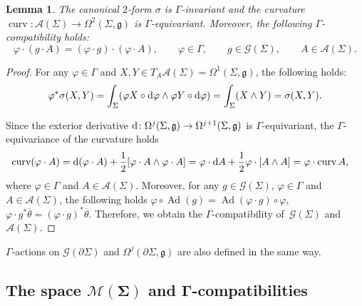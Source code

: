 \documentclass[pdftex]{sigma}
\numberwithin{equation}{section}
\newtheorem{Lemma}[Theorem]{Lemma}
\theoremstyle{definition}
\newcommand{\Ad}{\operatorname{Ad}}
\newcommand{\curv}{\operatorname{curv}}
\begin{document}
\begin{Lemma}\label{lemm of compati for conn}
 The canonical $2$-form $\sigma$ is $\Gamma$-invariant and the curvature $\curv \colon \mathcal{A}(\Sigma) \to \Omega^{2}(\Sigma,\mathfrak{g})$ is $\Gamma$-equivariant.
 Moreover, the following $\Gamma$-compatibility holds:
 \[
 \varphi \cdot (g \cdot A) = (\varphi \cdot g) \cdot (\varphi \cdot A), \qquad \varphi \in \Gamma,\qquad g \in \mathcal{G}(\Sigma),\qquad A \in \mathcal{A}(\Sigma).
 \]
\end{Lemma}

\begin{proof}For any $\varphi \in \Gamma$ and $X, Y \in T_A\mathcal{A}(\Sigma) = \Omega^{1}(\Sigma,\mathfrak{g})$, the following holds:
 \[\varphi^*\sigma(X,Y) = \int_{\Sigma} (\varphi X \circ {\rm d} \varphi \wedge \varphi Y \circ {\rm d} \varphi) = \int_{\Sigma}(X\wedge Y) = \sigma(X,Y).\]

Since the exterior derivative ${\rm d} \colon \Omega^{j}(\Sigma,\mathfrak{g}) \to \Omega^{j+1}(\Sigma,\mathfrak{g})$ is $\Gamma$-equivariant, the $\Gamma$-equivariance of the curvature holds
 \begin{align*}
 \curv(\varphi \cdot A) &= {\rm d}(\varphi \cdot A) + \frac{1}{2}[ \varphi \cdot A \wedge \varphi \cdot A] = \varphi \cdot {\rm d} A + \frac{1}{2}\varphi \cdot [A \wedge A]
 = \varphi \cdot \curv A,
 \end{align*}
 where $\varphi \in \Gamma$ and $A \in \mathcal{A}(\Sigma)$.
 Moreover, for any $g \in \mathcal{G}(\Sigma)$, $\varphi \in \Gamma$ and $A \in \mathcal{A}(\Sigma)$, the following holds
$\varphi \circ \Ad(g) = \Ad(\varphi \cdot g) \circ \varphi$,
$\varphi \cdot g^*\overline{\theta} = (\varphi \cdot g)^* \overline{\theta}$.
 Therefore, we obtain the $\Gamma$-compatibility of~$\mathcal{G}(\Sigma)$ and $\mathcal{A}(\Sigma)$.
\end{proof}

$\Gamma$-actions on $\mathcal{G}(\partial \Sigma)$ and $\Omega^{j}(\partial \Sigma, \mathfrak{g})$ are also defined in the same way.

\subsection[The space M(Sigma) and Gamma-compatibilities]{The space $\boldsymbol{\mathcal{M}(\Sigma)}$ and $\boldsymbol{\Gamma}$-compatibilities}
\end{document}
